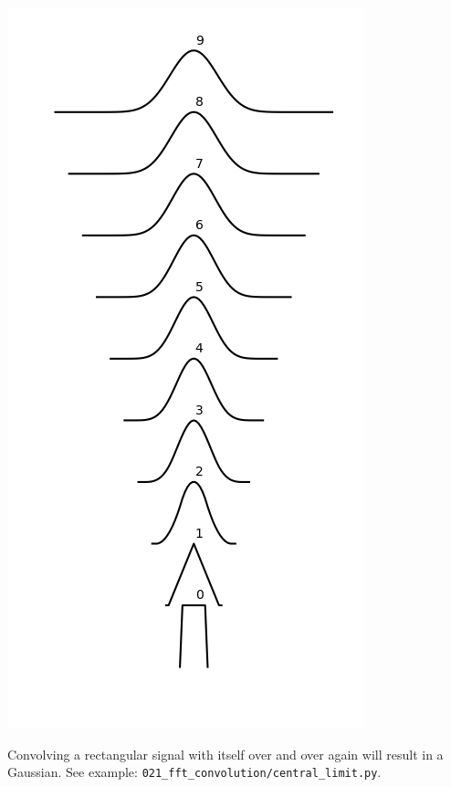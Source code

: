 \begin{marginfigure}
  \begin{center}
    \includegraphics[width=\textwidth]{code/021_fft_convolution/central_limit.png}
  \end{center}
  \caption{Convolving a rectangular signal with itself over and over
    again will result in a Gaussian. See example: \texttt{021\_fft\_convolution/central\_limit.py}.}
  \label{fig:fft_convolution2}
\end{marginfigure}

